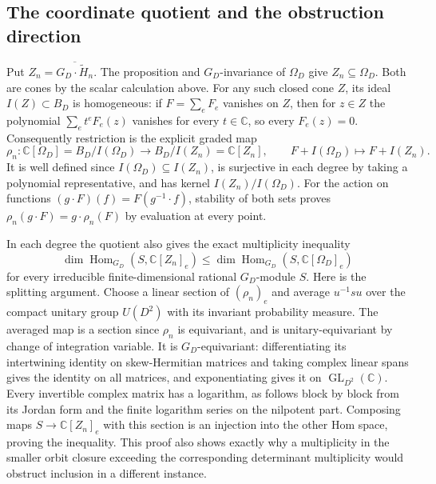 \subsection{The coordinate quotient and the obstruction direction}

Put $Z_n=\overline{G_D\cdot\widetilde H_n}$. The proposition and
$G_D$-invariance of $\Omega_D$ give $Z_n\subseteq\Omega_D$.
Both are cones by the scalar calculation above. For any such closed
cone $Z$, its ideal $I(Z)\subset B_D$ is homogeneous: if
$F=\sum_eF_e$ vanishes on $Z$, then for $z\in Z$ the polynomial
$\sum_e t^eF_e(z)$ vanishes for every $t\in\mathbb C$, so every
$F_e(z)=0$. Consequently restriction is the explicit graded map
\[
 \rho_n:\mathbb C[\Omega_D]=B_D/I(\Omega_D)
 \longrightarrow B_D/I(Z_n)=\mathbb C[Z_n],\qquad
 F+I(\Omega_D)\longmapsto F+I(Z_n).
\]
It is well defined since $I(\Omega_D)\subseteq I(Z_n)$, is surjective
in each degree by taking a polynomial representative, and has kernel
$I(Z_n)/I(\Omega_D)$. For the action on functions
$(g\cdot F)(f)=F(g^{-1}\cdot f)$, stability of both sets proves
$\rho_n(g\cdot F)=g\cdot\rho_n(F)$ by evaluation at every point.

In each degree the quotient also gives the exact multiplicity inequality
\[
 \dim\operatorname{Hom}_{G_D}(S,\mathbb C[Z_n]_e)
 \le \dim\operatorname{Hom}_{G_D}(S,\mathbb C[\Omega_D]_e)
\]
for every irreducible finite-dimensional rational $G_D$-module $S$.
Here is the splitting argument. Choose a linear section of $(\rho_n)_e$
and average $u^{-1}s u$ over the compact unitary group $U(D^2)$ with
its invariant probability measure. The averaged map is a section since
$\rho_n$ is equivariant, and is unitary-equivariant by change of integration
variable. It is $G_D$-equivariant: differentiating its intertwining
identity on skew-Hermitian matrices and taking complex linear spans
gives the identity on all matrices, and exponentiating gives it on
$\operatorname{GL}_{D^2}(\mathbb C)$. Every invertible complex matrix has a logarithm,
as follows block by block from its Jordan form and the finite logarithm
series on the nilpotent part. Composing maps $S\to\mathbb C[Z_n]_e$
with this section is an injection into the other Hom space, proving
the inequality. This proof also shows exactly why a multiplicity in the
smaller orbit closure exceeding the corresponding determinant multiplicity
would obstruct inclusion in a different instance.

